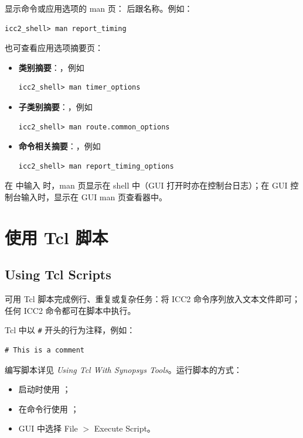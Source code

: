 显示命令或应用选项的 man 页： 后跟名称。例如：
\begin{lstlisting}
icc2_shell> man report_timing
\end{lstlisting}

也可查看应用选项摘要页：
\begin{itemize}
  \item \textbf{类别摘要}：，例如
\begin{lstlisting}
icc2_shell> man timer_options
\end{lstlisting}
  \item \textbf{子类别摘要}：，例如
\begin{lstlisting}
icc2_shell> man route.common_options
\end{lstlisting}
  \item \textbf{命令相关摘要}：，例如
\begin{lstlisting}
icc2_shell> man report_timing_options
\end{lstlisting}
\end{itemize}

在  中输入  时，man 页显示在 shell 中（GUI 打开时亦在控制台日志）；在 GUI 控制台输入时，显示在 GUI man 页查看器中。

\section{使用 Tcl 脚本}
\subsection*{Using Tcl Scripts}

可用 Tcl 脚本完成例行、重复或复杂任务：将 ICC2 命令序列放入文本文件即可；任何 ICC2 命令都可在脚本中执行。

Tcl 中以 \texttt{\#} 开头的行为注释，例如：
\begin{lstlisting}
# This is a comment
\end{lstlisting}

编写脚本详见 \textit{Using Tcl With Synopsys Tools}。运行脚本的方式：
\begin{itemize}
  \item 启动时使用 ；
  \item 在命令行使用 ；
  \item GUI 中选择 File $>$ Execute Script。
\end{itemize}

